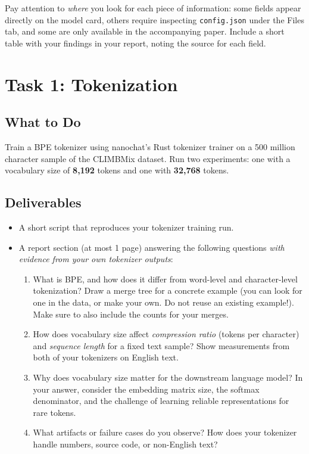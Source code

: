 Pay attention to \emph{where} you look for each piece of information: some fields appear directly on the model card, others require inspecting \texttt{config.json} under the Files tab, and some are only available in the accompanying paper. Include a short table with your findings in your report, noting the source for each field.

\section{Task 1: Tokenization}
\label{sec:task1}

\subsection{What to Do}

Train a BPE tokenizer using nanochat's Rust tokenizer trainer on a 500 million character sample of the CLIMBMix dataset. Run two experiments: one with a vocabulary size of \textbf{8{,}192} tokens and one with \textbf{32{,}768} tokens.

\subsection{Deliverables}

\begin{itemize}
    \item A short script that reproduces your tokenizer training run.
    \item A report section (at most 1 page) answering the following questions \emph{with evidence from your own tokenizer outputs}:
          \begin{enumerate}
              \item What is BPE, and how does it differ from word-level and character-level tokenization?  Draw a merge tree for a concrete example (you can look for one in the data, or make your own. Do not reuse an existing example!). Make sure to also include the counts for your merges.
              \item How does vocabulary size affect \emph{compression ratio} (tokens per character) and \emph{sequence length} for a fixed text sample?  Show measurements from both of your tokenizers on English text.
              \item Why does vocabulary size matter for the downstream language model?  In your answer, consider the embedding matrix size, the softmax denominator, and the challenge of learning reliable representations for rare tokens.
              \item What artifacts or failure cases do you observe?  How does your tokenizer handle numbers, source code, or non-English text?
          \end{enumerate}
\end{itemize}

